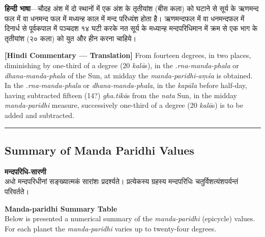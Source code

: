 \documentclass[11pt,a4paper]{book}
\newcommand{\dev}[1]{{\devanagarifont #1}}
\newcommand{\bilingual}[2]{%
  \par\vspace{0.6em}%
  \noindent\begin{minipage}[t]{0.48\textwidth}
    \RaggedRight
    #1%
  \end{minipage}%
  \hfill
  \begin{minipage}[t]{0.48\textwidth}
    \RaggedRight
    #2%
  \end{minipage}%
  \par\vspace{0.6em}%
}
\newcommand{\hindicommbilingual}[2]{%
  \par\vspace{0.5em}%
  \noindent\begin{minipage}[t]{0.48\textwidth}
    \RaggedRight\small
    \dev{#1}
  \end{minipage}%
  \hfill
  \begin{minipage}[t]{0.48\textwidth}
    \RaggedRight\small
    #2%
  \end{minipage}%
  \par\vspace{0.5em}%
}
\newcommand{\secdivider}{%
  \begin{center}\rule{0.4\textwidth}{0.5pt}\end{center}%
}
\begin{document}
\hindicommbilingual{%
\textbf{हिन्दी भाषा}---चौदह अंश में दो स्थानों में एक अंश के तृतीयांश (बीस कला) को घटाने से सूर्य के ऋणमन्द फल में वा धनमन्द फल में मध्यन्ह काल में मन्द परिध्यंश होता है। ऋणमन्दफल में वा धनमन्दफल में दिनार्ध से पूर्वकपाल में पञ्चदश १४ घटी करके नत सूर्य के मध्यान्ह मन्दपरिधिमान में क्रम से एक भाग के तृतीयांश (२० कला) को युत और हीन करना चाहिये।
}{%
\textbf{[Hindi Commentary --- Translation]} From fourteen degrees, in two places, diminishing by one-third of a degree (20 \textit{kalā}s), in the \textit{.rna-manda-phala} or \textit{dhana-manda-phala} of the Sun, at midday the \textit{manda-paridhi-aṃśa} is obtained. In the \textit{.rna-manda-phala} or \textit{dhana-manda-phala}, in the \textit{kapāla} before half-day, having subtracted fifteen (14?) \textit{gha.tikā}s from the \textit{nata} Sun, in the midday \textit{manda-paridhi} measure, successively one-third of a degree (20 \textit{kalā}s) is to be added and subtracted.
}

\secdivider
\clearpage

\subsection*{Summary of Manda Paridhi Values}

\bilingual{%
\textbf{\dev{मन्दपरिधि-सारणी}}\\[0.3em]
अधो मन्दपरिधीनां सङ्ख्यात्मकं सारांशः प्रदर्श्यते। प्रत्येकस्य ग्रहस्य मन्दपरिधिः चतुर्विशत्यंशपर्यन्तं परिवर्तते।
}{%
\textbf{Manda-paridhi Summary Table}\\[0.3em]
Below is presented a numerical summary of the \textit{manda-paridhi} (epicycle) values. For each planet the \textit{manda-paridhi} varies up to twenty-four degrees.
}

\vspace{0.5em}
\end{document}
